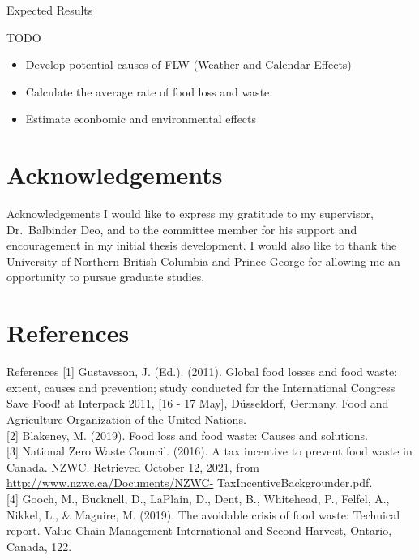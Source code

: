\documentclass[
  ignorenonframetext,
]{beamer}
\providecommand{\tightlist}{%
  \setlength{\itemsep}{0pt}\setlength{\parskip}{0pt}}
\begin{document}
\begin{frame}{Expected Results}
\protect\hypertarget{expected-results-4}{}
\begin{block}{TODO}
\protect\hypertarget{todo}{}
\begin{itemize}
\tightlist
\item
  Develop potential causes of FLW (Weather and Calendar Effects)
\item
  Calculate the average rate of food loss and waste
\item
  Estimate econbomic and environmental effects
\end{itemize}
\end{block}
\end{frame}

\hypertarget{acknowledgements}{%
\section{Acknowledgements}\label{acknowledgements}}

\begin{frame}{Acknowledgements}
\protect\hypertarget{acknowledgements-1}{}
I would like to express my gratitude to my supervisor, Dr.~Balbinder
Deo, and to the committee member for his support and encouragement in my
initial thesis development. I would also like to thank the University of
Northern British Columbia and Prince George for allowing me an
opportunity to pursue graduate studies.
\end{frame}

\hypertarget{references}{%
\section{References}\label{references}}

\begin{frame}{References}
\protect\hypertarget{references-1}{}
{[}1{]} Gustavsson, J. (Ed.). (2011). Global food losses and food waste:
extent, causes and prevention; study conducted for the International
Congress Save Food! at Interpack 2011, {[}16 - 17 May{]}, Düsseldorf,
Germany. Food and Agriculture Organization of the United Nations.\\
{[}2{]} Blakeney, M. (2019). Food loss and food waste: Causes and
solutions.\\
{[}3{]} National Zero Waste Council. (2016). A tax incentive to prevent
food waste in Canada. NZWC. Retrieved October 12, 2021, from
\url{http://www.nzwc.ca/Documents/NZWC-} TaxIncentiveBackgrounder.pdf.\\
{[}4{]} Gooch, M., Bucknell, D., LaPlain, D., Dent, B., Whitehead, P.,
Felfel, A., Nikkel, L., \& Maguire, M. (2019). The avoidable crisis of
food waste: Technical report. Value Chain Management International and
Second Harvest, Ontario, Canada, 122.\\
\end{frame}
\end{document}
